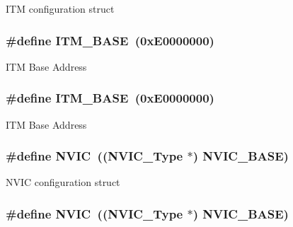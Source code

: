I\-T\-M configuration struct \hypertarget{group___c_m_s_i_s___c_m3__core__register_gadd76251e412a195ec0a8f47227a8359e}{
\subsubsection[{I\-T\-M\-\_\-\-B\-A\-S\-E}]{\setlength{\rightskip}{0pt plus 5cm}\#define I\-T\-M\-\_\-\-B\-A\-S\-E~(0x\-E0000000)}}\label{group___c_m_s_i_s___c_m3__core__register_gadd76251e412a195ec0a8f47227a8359e}
I\-T\-M Base Address \hypertarget{group___c_m_s_i_s___c_m3__core__register_gadd76251e412a195ec0a8f47227a8359e}{
\subsubsection[{I\-T\-M\-\_\-\-B\-A\-S\-E}]{\setlength{\rightskip}{0pt plus 5cm}\#define I\-T\-M\-\_\-\-B\-A\-S\-E~(0x\-E0000000)}}\label{group___c_m_s_i_s___c_m3__core__register_gadd76251e412a195ec0a8f47227a8359e}
I\-T\-M Base Address \hypertarget{group___c_m_s_i_s___c_m3__core__register_gac8e97e8ce56ae9f57da1363a937f8a17}{
\subsubsection[{N\-V\-I\-C}]{\setlength{\rightskip}{0pt plus 5cm}\#define N\-V\-I\-C~(({\bf N\-V\-I\-C\-\_\-\-Type} $\ast$)          {\bf N\-V\-I\-C\-\_\-\-B\-A\-S\-E})}}\label{group___c_m_s_i_s___c_m3__core__register_gac8e97e8ce56ae9f57da1363a937f8a17}
N\-V\-I\-C configuration struct \hypertarget{group___c_m_s_i_s___c_m3__core__register_gac8e97e8ce56ae9f57da1363a937f8a17}{
\subsubsection[{N\-V\-I\-C}]{\setlength{\rightskip}{0pt plus 5cm}\#define N\-V\-I\-C~(({\bf N\-V\-I\-C\-\_\-\-Type} $\ast$)          {\bf N\-V\-I\-C\-\_\-\-B\-A\-S\-E})}}\label{group___c_m_s_i_s___c_m3__core__register_gac8e97e8ce56ae9f57da1363a937f8a17}
